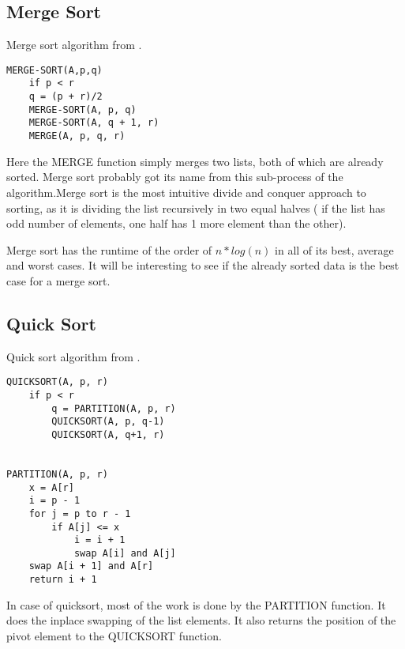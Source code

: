 \documentclass[sigconf, nonacm, natbib, screen, balance=False]{acmart}
\begin{document}
\subsection{Merge Sort}\label{sec:merge sort}

\begin{listing}
  \caption{Merge sort algorithm from \citet[Ch.~2.3.1]{CLRS_2009}.}
  \label{lst:merge_algo}

\begin{verbatim}
MERGE-SORT(A,p,q)
    if p < r
    q = (p + r)/2
    MERGE-SORT(A, p, q)
    MERGE-SORT(A, q + 1, r)
    MERGE(A, p, q, r)
\end{verbatim}
\end{listing}

Here the MERGE function simply merges two lists, both of which are already sorted. Merge sort probably got its name from this sub-process of the algorithm.Merge sort is the most intuitive divide and conquer approach to sorting, as it is dividing the list 
recursively in two equal halves ( if the list has odd number of elements, one half has 1 more element than the other).

Merge sort has the runtime of the order of $n*log(n)$ in all of its best, average and worst cases. It will be interesting to see 
if the already sorted data is the best case for a merge sort.

\subsection{Quick Sort}\label{sec:quick sort}

\begin{listing}
  \caption{Quick sort algorithm from \citet[Ch.~2.3.1]{CLRS_2009}.}
  \label{lst:quick_algo}

\begin{verbatim}
QUICKSORT(A, p, r)
    if p < r
        q = PARTITION(A, p, r)
        QUICKSORT(A, p, q-1)
        QUICKSORT(A, q+1, r)


PARTITION(A, p, r)
    x = A[r]
    i = p - 1
    for j = p to r - 1
        if A[j] <= x
            i = i + 1
            swap A[i] and A[j]
    swap A[i + 1] and A[r]
    return i + 1
\end{verbatim}
\end{listing}

In case of quicksort, most of the work is done by the PARTITION function. It does the inplace swapping of the list elements. It also 
returns the position of the pivot element to the QUICKSORT function.
\end{document}
